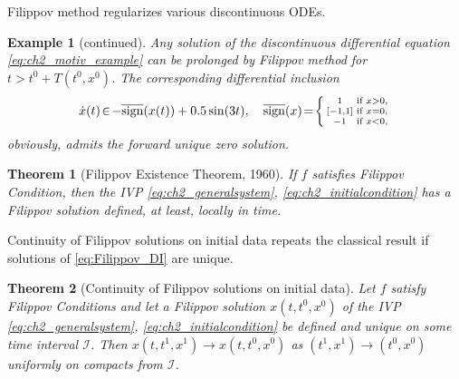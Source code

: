 \documentclass{article}
\newcommand{\sign}{\mathrm{sign}}
\newtheorem{theorem}{Theorem}
\newtheorem{example}{Example}
\begin{document}
Filippov method regularizes various discontinuous ODEs.
\addtocounter{example}{-1}
\begin{example}[continued]\itshape
Any solution of the discontinuous differential equation  \eqref{eq:ch2_motiv_example}  can be  prolonged 
by Filippov method for $t>t^0+T(t^0,x^0)$. The corresponding differential inclusion \vspace{-2mm}
	$$
	\dot x(t)\!\in\! -\overline{\sign}(x(t))+0.5\sin(3t), \quad \overline{\sign}(x)\!=\!\left\{
	\begin{smallmatrix}
		1& \text{if} &x>0,\\
		\mathrm{[}-1,1\mathrm{]} &\text{if} &  x=0,\\
		-1 & \text{if} & x<0,\\
	\end{smallmatrix}
	\right.\vspace{-1mm}
	$$
	obviously, admits the forward unique zero solution.
\end{example}
\begin{theorem}[Filippov Existence Theorem, 1960]\itshape
{If $f$ satisfies Filippov Condition}, then the IVP \eqref{eq:ch2_generalsystem}, \eqref{eq:ch2_initialcondition} has a Filippov solution  defined, at least, locally in time.
\end{theorem}

	Continuity of Filippov solutions on initial data  \cite[page 98]{Filippov1988:Book} repeats the classical result if solutions of  \eqref{eq:Filippov_DI} are unique.   
	\begin{theorem}[\small Continuity of Filippov solutions on initial data]\label{thm:con_sol_Filippov_Rn}
		\itshape Let $f $ satisfy Filippov Conditions
		and let a Filippov solution $x(t,t^0,x^0)$ of the IVP \eqref{eq:ch2_generalsystem}, \eqref{eq:ch2_initialcondition}  be defined and unique on some time interval $\mathcal{I}$.
		Then $x(t,t^1,x^1)\to x(t,t^0,x^0)$ as $(t^1,x^1)\to (t^0,x^0)$ uniformly on compacts from $\mathcal{I}$.
	\end{theorem}
\vspace{-1mm}
\end{document}
